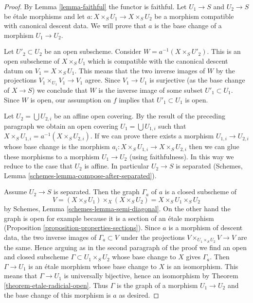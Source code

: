 \begin{proof}
By Lemma \ref{lemma-faithful} the functor is faithful.
Let $U_1 \to S$ and $U_2 \to S$ be \'etale morphisms
and let $a : X \times_S U_1 \to X \times_S U_2$ be a
morphism compatible with canonical descent data.
We will prove that $a$ is the base change of a morphism $U_1 \to U_2$.

\medskip\noindent
Let $U'_2 \subset U_2$ be an open subscheme. Consider
$W = a^{-1}(X \times_S U'_2)$. This is an open subscheme
of $X \times_S U_1$ which is compatible with the canonical
descent datum on $V_1 = X \times_S U_1$. This means that the
two inverse images of $W$ by the projections
$V_1 \times_{U_1} V_1 \to V_1$ agree. Since $V_1 \to U_1$
is surjective (as the base change of $X \to S$) we conclude
that $W$ is the inverse image of some subset $U'_1 \subset U_1$.
Since $W$ is open, our assumption on $f$ implies that $U'_1 \subset U_1$
is open.

\medskip\noindent
Let $U_2 = \bigcup U_{2, i}$ be an affine open covering.
By the result of the preceding paragraph we obtain an open
covering $U_1 = \bigcup U_{1, i}$ such that
$X \times_S U_{1, i} = a^{-1}(X \times_S U_{2, i})$.
If we can prove there exists a morphism $U_{1, i} \to U_{2, i}$
whose base change is the morphism
$a_i : X \times_S U_{1, i} \to X \times_S U_{2, i}$
then we can glue these morphisms to a morphism $U_1 \to U_2$
(using faithfulness). In this way we reduce to the case that
$U_2$ is affine. In particular $U_2 \to S$ is separated
(Schemes, Lemma \ref{schemes-lemma-compose-after-separated}).

\medskip\noindent
Assume $U_2 \to S$ is separated. Then the graph $\Gamma_a$ of $a$
is a closed subscheme of
$$
V = (X \times_S U_1) \times_X (X \times_S U_2) = X \times_S U_1 \times_S U_2
$$
by Schemes, Lemma \ref{schemes-lemma-semi-diagonal}.
On the other hand the graph is open for example
because it is a section of an \'etale morphism
(Proposition \ref{proposition-properties-sections}).
Since $a$ is a morphism of descent data, the two inverse images of
$\Gamma_a \subset V$ under the projections
$V \times_{U_1 \times_S U_2} V \to V$ are the same.
Hence arguing as in the second paragraph of the proof we
find an open and closed subscheme $\Gamma \subset U_1 \times_S U_2$
whose base change to $X$ gives $\Gamma_a$. Then
$\Gamma \to U_1$ is an \'etale morphism whose base change
to $X$ is an isomorphism. This means that $\Gamma \to U_1$
is universally bijective, hence an isomorphism
by Theorem \ref{theorem-etale-radicial-open}.
Thus $\Gamma$ is the graph of a morphism $U_1 \to U_2$
and the base change of this morphism is $a$ as desired.
\end{proof}

